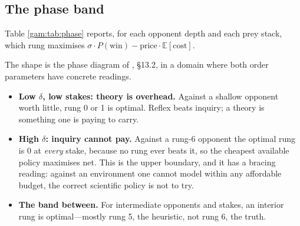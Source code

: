 \subsection{The phase band}\label{gam:S8.3}

Table \ref{gam:tab:phase} reports, for each opponent depth and each prey stack, which
rung maximises $\sigma\cdot P(\text{win}) - \text{price}\cdot \mathbb{E}[\text{cost}]$.

\begin{table}[h]
\centering
{}
\caption{Optimal rung, at price $0.05$ per metered unit, as a function of the
prey's stack $\sigma$ (rows) and the prey's own rung (columns). The optimal rung
is $0$ in both extremes and interior in between.}
\label{gam:tab:phase}
\end{table}

The shape is the phase diagram of \chSci, \S13.2, in a domain where
both order parameters have concrete readings.

\begin{itemize}
\item \textbf{Low $\delta$, low stakes: theory is overhead.} Against a shallow
opponent worth little, rung 0 or 1 is optimal. Reflex beats inquiry; a theory is
something one is paying to carry.
\item \textbf{High $\delta$: inquiry cannot pay.} Against a rung-6 opponent the
optimal rung is $0$ at \emph{every} stake, because no rung ever beats it, so the
cheapest available policy maximises net. This is the upper boundary, and it has
a bracing reading: against an environment one cannot model within any affordable
budget, the correct scientific policy is not to try.
\item \textbf{The band between.} For intermediate opponents and stakes, an
interior rung is optimal---mostly rung 5, the heuristic, not rung 6, the truth.
\end{itemize}

